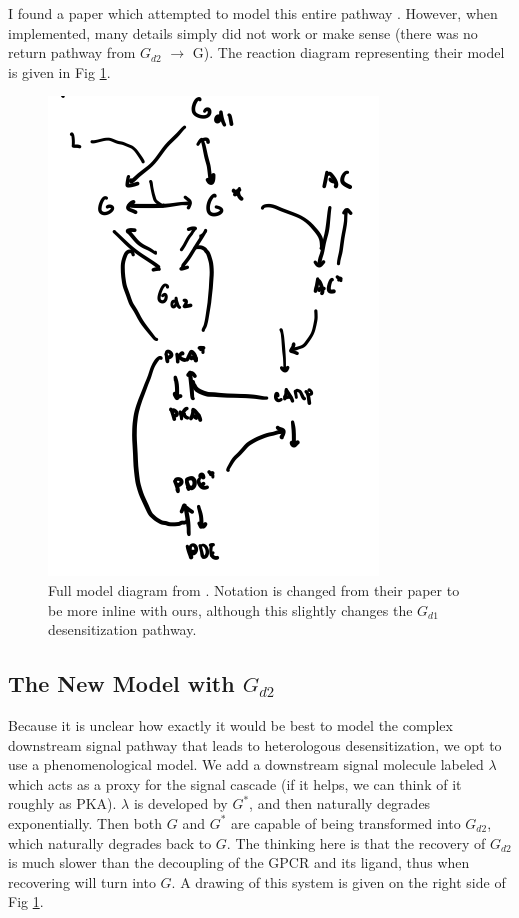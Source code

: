\documentclass[12pt]{article}
\begin{document}
I found a paper which attempted to model this entire pathway \cite{violin2008beta2}. However, when implemented, many details simply did not work or make sense (there was no return pathway from $G_{d2}$ $\rightarrow$ G). The reaction diagram representing their model is given in Fig \ref{fig:Gd2_full_model}.

\begin{figure}[H]
	\includegraphics[width=0.4\linewidth]{Gd2_full_path.png}
	\centering
	\caption{Full model diagram from \cite{violin2008beta2}. Notation is changed from their paper to be more inline with ours, although this slightly changes the $G_{d1}$ desensitization pathway.}
	\label{fig:Gd2_full_model}
\end{figure}

\subsection{The New Model with $G_{d2}$}

Because it is unclear how exactly it would be best to model the complex downstream signal pathway that leads to heterologous desensitization, we opt to use a phenomenological model. We add a downstream signal molecule labeled $\lambda$ which acts as a proxy for the signal cascade (if it helps, we can think of it roughly as PKA). $\lambda$ is developed by $G^*$, and then naturally degrades exponentially. Then both $G$ and $G^*$ are capable of being transformed into $G_{d2}$, which naturally degrades back to $G$. The thinking here is that the recovery of $G_{d2}$ is much slower than the decoupling of the GPCR and its ligand, thus when recovering will turn into $G$. A drawing of this system is given on the right side of Fig \ref{fig:Gd2_full_model}.
\end{document}
